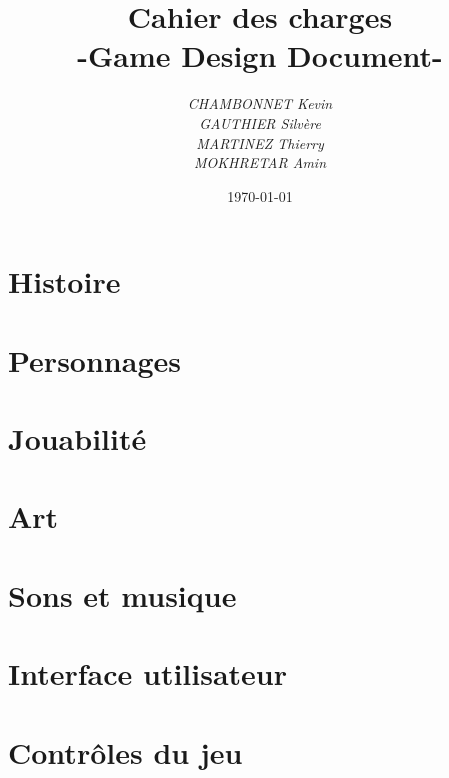\documentclass[a4paper]{article}
\title{Cahier des charges\\-Game Design Document-}
\author{\emph{CHAMBONNET Kevin}\\\emph{GAUTHIER Silvère}\\\emph{MARTINEZ Thierry}\\\emph{MOKHRETAR Amin}}
\date{\today}
\begin{document}
\maketitle

\section*{Histoire}
\section*{Personnages}
\section*{Jouabilité}
\section*{Art}
\section*{Sons et musique}
\section*{Interface utilisateur}
\section*{Contrôles du jeu}
\end{document}
